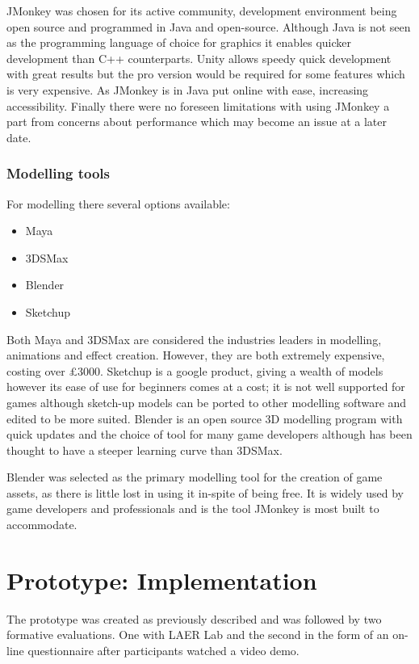 \documentclass[11pt]{report}
\begin{document}
JMonkey was chosen for its active community, development environment being open source and programmed in Java and open-source. Although Java is not seen as the programming language of choice for graphics it enables quicker development than C++ counterparts. Unity allows speedy quick development with great results but the pro version would be required for some features which is very expensive. As JMonkey is in Java put online with ease, increasing accessibility. Finally there were no foreseen limitations with using JMonkey a part from concerns about performance which may become an issue at a later date.

\subsection{Modelling tools}
For modelling there several options available:
\begin{itemize}
\item Maya
\item 3DSMax
\item Blender
\item Sketchup
\end{itemize}

Both Maya and 3DSMax are considered the industries leaders in modelling, animations and effect creation. However, they are both extremely expensive, costing over £3000. Sketchup is a google product, giving a wealth of models however its ease of use for beginners comes at a cost; it is not well supported for games although sketch-up models can be ported to other modelling software and edited to be more suited. Blender is an open source 3D modelling program with quick updates and the choice of tool for many game developers although has been thought to have a steeper learning curve than 3DSMax.

Blender was selected as the primary modelling tool for the creation of game assets, as there is little lost in using it in-spite of being free. It is widely used by game developers and professionals and is the tool JMonkey is most built to accommodate.

\chapter{Prototype: Implementation}
The prototype was created as previously described and was followed by two formative evaluations. One with LAER Lab and the second in the form of an on-line questionnaire after participants watched a video demo. 
\end{document}
